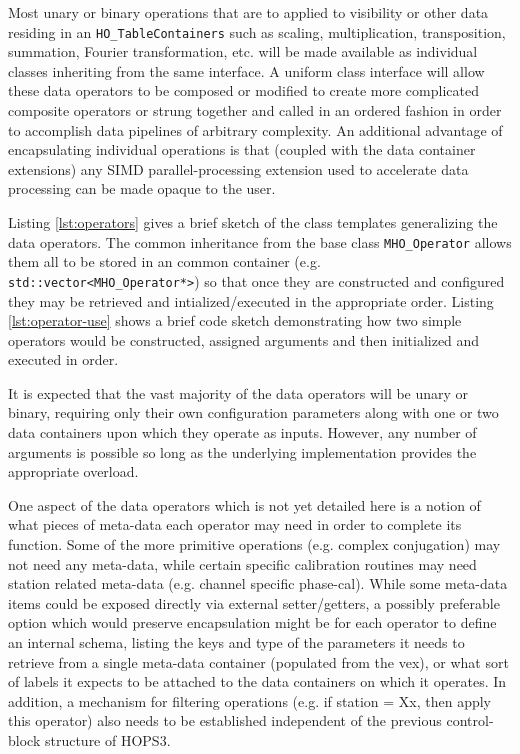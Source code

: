 Most unary or binary operations that are to applied to visibility or other data residing in an \texttt{HO\_TableContainers} such as scaling, multiplication, transposition, summation, Fourier transformation, etc. will be made available as individual classes inheriting from the same interface. A uniform class interface will allow these data operators to be composed or modified to create more complicated composite operators or strung together and called in an ordered fashion in order to accomplish data pipelines of arbitrary complexity. An additional advantage of encapsulating individual operations is that (coupled with the data container extensions) any SIMD parallel-processing extension used to accelerate data processing can be made opaque to the user.

Listing \ref{lst:operators} gives a brief sketch of the class templates generalizing the data operators. The common inheritance from the base class \texttt{MHO\_Operator} allows them all to be stored in an common container (e.g. \texttt{std::vector<MHO\_Operator*>}) so that once they are
constructed and configured they may be retrieved and intialized/executed in the appropriate order. Listing \ref{lst:operator-use} shows a brief code
sketch demonstrating how two simple operators would be constructed, assigned arguments and then initialized and executed in order.



It is expected that the vast majority of the data operators will be unary or binary, requiring only their own configuration parameters along with one or two data containers upon which they operate as inputs. 
However, any number of arguments is possible so long as the underlying implementation provides the appropriate overload.

One aspect of the data operators which is not yet detailed here is a notion of what pieces of meta-data each operator may need in order to complete its function. 
Some of the more primitive operations (e.g. complex conjugation) may not need any meta-data, while certain 
specific calibration routines may need station related meta-data (e.g. channel specific phase-cal).
While some meta-data items could be exposed directly via external setter/getters, a possibly preferable option which would preserve encapsulation might be for each operator to define an internal schema, 
listing the keys and type of the parameters it needs to retrieve from a single meta-data container (populated from the vex), or what sort of labels it expects to be attached to the data containers on which it operates.
In addition, a mechanism for filtering operations (e.g. if station = Xx, then apply this operator) also needs to be established independent of the previous control-block structure of HOPS3.

